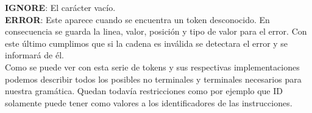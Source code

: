\newline
\textbf{IGNORE}: El carácter vacío.\\
\newline
\textbf{ERROR}: Este aparece cuando se encuentra un token desconocido. En consecuencia se guarda la linea, valor, posición y
tipo de valor para el error. Con este último cumplimos que si la cadena es inválida se detectara el error y se informará de él.\\
\newline
Como se puede ver con esta serie de tokens y sus respectivas implementaciones podemos describir todos los posibles no terminales y terminales
necesarios para nuestra gramática. Quedan todavía restricciones como por ejemplo que ID solamente puede tener como valores a los
identificadores de las instrucciones.\\
